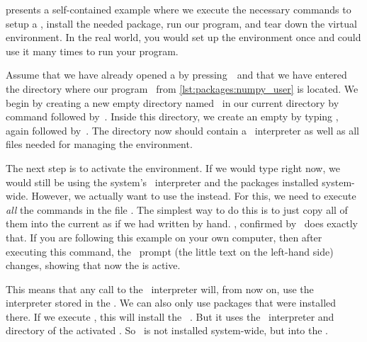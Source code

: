 %
%
 presents a self-contained example where we execute the necessary commands to setup a , install the needed package, run our program, and tear down the virtual environment.
In the real world, you would set up the environment once and could use it many times to run your program.

Assume that we have already opened a  by pressing~\ubuntuTerminal\ and that we have entered the directory where our program~ from \cref{lst:packages:numpy_user} is located.
We begin by creating a new empty directory named~ in our current directory by  command followed by~\keys{\return}.
Inside this directory, we create an empty  by typing , again followed by~\keys{\return}.
The directory  now should contain a \python\ interpreter as well as all files needed for managing the environment.

The next step is to activate the environment.
If we would type  right now, we would still be using the system's \python\ interpreter and the packages installed system-wide.
However, we actually want to use the  instead.
For this, we need to execute \emph{all} the commands in the file .
The simplest way to do this is to just copy all of them into the current  as if we had written by hand.
, confirmed by~\keys{\return} does exactly that.
If you are following this example on your own computer, then after executing this command, the \bash\ prompt (the little text on the left-hand side) changes, showing that now the  is active.

This means that any call to the \python\ interpreter will, from now on, use the interpreter stored in the .
We can also only use packages that were installed there.
If we execute , this will install the \numpy\ .
But it uses the \python\ interpreter and  directory of the activated .
So \numpy\ is not installed system-wide, but into the .

